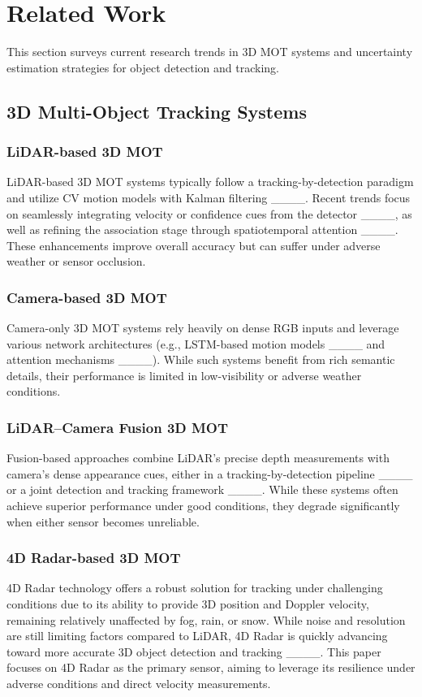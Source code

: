 \section{Related Work}
\label{sec:sec2}
This section surveys current research trends in 3D MOT systems and uncertainty estimation strategies for object detection and tracking.

\subsection{3D Multi-Object Tracking Systems}
\label{sec:sec2a}

\subsubsection{LiDAR-based 3D MOT}
LiDAR-based 3D MOT systems typically follow a tracking-by-detection paradigm and utilize CV motion models with Kalman filtering ____. Recent trends focus on seamlessly integrating velocity or confidence cues from the detector ____, as well as refining the association stage through spatiotemporal attention ____. These enhancements improve overall accuracy but can suffer under adverse weather or sensor occlusion.

\subsubsection{Camera-based 3D MOT}
Camera-only 3D MOT systems rely heavily on dense RGB inputs and leverage various network architectures (e.g., LSTM-based motion models ____ and attention mechanisms ____). While such systems benefit from rich semantic details, their performance is limited in low-visibility or adverse weather conditions.

\subsubsection{LiDAR–Camera Fusion 3D MOT}
Fusion-based approaches combine LiDAR’s precise depth measurements with camera’s dense appearance cues, either in a tracking-by-detection pipeline ____ or a joint detection and tracking framework ____. While these systems often achieve superior performance under good conditions, they degrade significantly when either sensor becomes unreliable.

\subsubsection{4D Radar-based 3D MOT}
4D Radar technology offers a robust solution for tracking under challenging conditions due to its ability to provide 3D position and Doppler velocity, remaining relatively unaffected by fog, rain, or snow. While noise and resolution are still limiting factors compared to LiDAR, 4D Radar is quickly advancing toward more accurate 3D object detection and tracking ____. This paper focuses on 4D Radar as the primary sensor, aiming to leverage its resilience under adverse conditions and direct velocity measurements.


